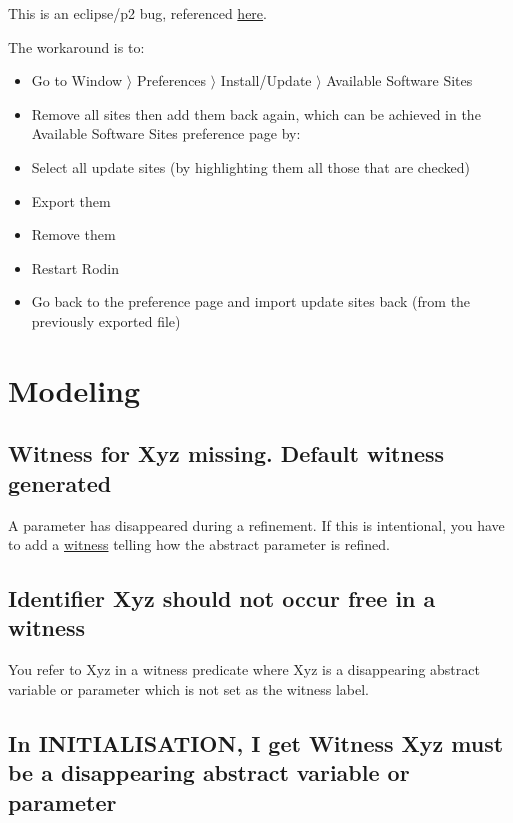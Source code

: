This is an eclipse/p2 bug, referenced \href{http://stackoverflow.com/questions/511367/error-when-updating-eclipse}{here}. 

The workaround is to: 

\begin{itemize}
	\item Go to \textsf{Window $\rangle$ Preferences $\rangle$ Install/Update $\rangle$ Available Software Sites} 
	\item Remove all sites then add them back again, which can be achieved in the \textsf{Available Software Sites} preference page by: 
	\item Select all update sites (by highlighting them all those that are checked) 
	\item Export them 
	\item Remove them
	\item Restart Rodin
	\item Go back to the preference page and import update sites back (from the previously exported file) 
\end{itemize}

\section{Modeling}

\subsection{Witness for \textsf{Xyz} missing. Default witness generated}

A parameter has disappeared during a refinement. If this is intentional, you have to add a \href{http://wiki.event-b.org/index.php/Witnesses_(Modelling_Language)}{witness} telling how the abstract parameter is refined. 

\subsection{Identifier \textsf{Xyz} should not occur free in a witness}

You refer to \textsf{Xyz} in a witness predicate where \textsf{Xyz} is a disappearing abstract variable or parameter which is not set as the witness label. 

\subsection{In \textsf{INITIALISATION}, I get Witness \textsf{Xyz} must be a disappearing abstract variable or parameter}

